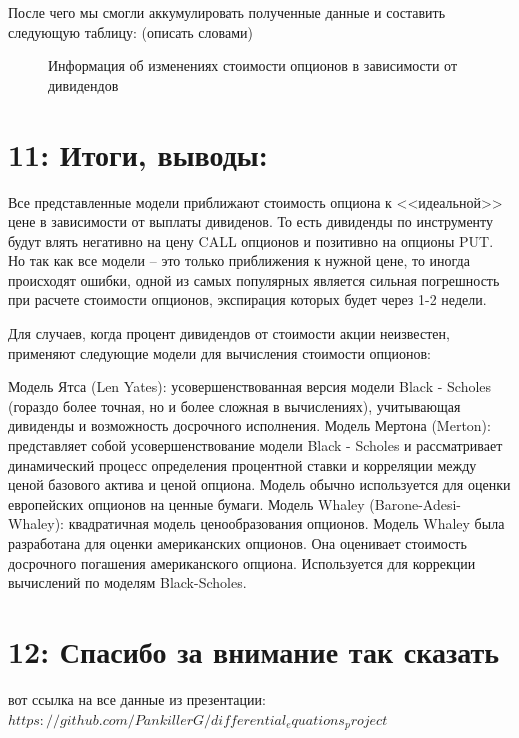 \documentclass[a4paper]{article}
\begin{document}
После чего мы смогли аккумулировать полученные данные и составить следующую таблицу: (описать словами)
\begin{figure}[h]
    \caption{Информация об изменениях стоимости опционов в зависимости от дивидендов}
    \label{fig:image}
\end{figure}

\section*{11: Итоги, выводы:}
Все представленные модели приближают стоимость опциона к <<идеальной>> цене в зависимости от выплаты дивиденов. То есть дивиденды по инструменту будут влять негативно на цену CALL опционов и позитивно на опционы PUT.
Но так как все модели -- это только приближения к нужной цене, то иногда происходят ошибки, одной из самых популярных является сильная погрешность при расчете стоимости опционов, экспирация которых будет через 1-2 недели.




Для случаев, когда процент дивидендов от стоимости акции неизвестен, применяют следующие модели для вычисления стоимости опционов:

Модель Ятса (Len Yates): усовершенствованная версия модели Black - Scholes (гораздо более точная, но и более сложная в вычислениях), учитывающая дивиденды и возможность досрочного исполнения.
Модель Мертона (Merton): представляет собой усовершенствование модели Black - Scholes и рассматривает динамический процесс определения процентной ставки и корреляции между ценой базового актива и ценой опциона. Модель обычно используется для оценки европейских опционов на ценные бумаги.
Модель Whaley (Barone-Adesi-Whaley): квадратичная модель ценообразования опционов. Модель Whaley была разработана для оценки американских опционов. Она оценивает стоимость досрочного погашения американского опциона. Используется для коррекции вычислений по моделям Black-Scholes.

\section*{12: Спасибо за внимание так сказать}
вот ссылка на все данные из презентации: \\
$https://github.com/PankillerG/differential_equations_project$
\end{document}
